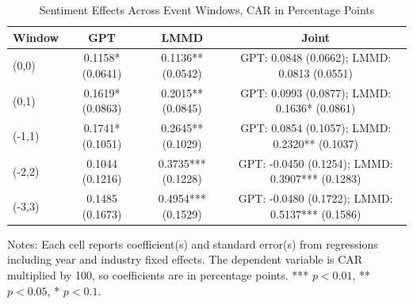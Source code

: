 \begin{table}[htbp]
\centering
\caption{Sentiment Effects Across Event Windows, CAR in Percentage Points}
\label{tab:car_sentiment_windows}
\begin{tabular}{lccc}
\toprule
Window & GPT & LMMD & Joint \\
\midrule
(0,0) & 0.1158* (0.0641) & 0.1136** (0.0542) & GPT: 0.0848 (0.0662); LMMD: 0.0813 (0.0551) \\
(0,1) & 0.1619* (0.0863) & 0.2015** (0.0845) & GPT: 0.0993 (0.0877); LMMD: 0.1636* (0.0861) \\
(-1,1) & 0.1741* (0.1051) & 0.2645** (0.1029) & GPT: 0.0854 (0.1057); LMMD: 0.2320** (0.1037) \\
(-2,2) & 0.1044 (0.1216) & 0.3735*** (0.1228) & GPT: -0.0450 (0.1254); LMMD: 0.3907*** (0.1283) \\
(-3,3) & 0.1485 (0.1673) & 0.4954*** (0.1529) & GPT: -0.0480 (0.1722); LMMD: 0.5137*** (0.1586) \\
\bottomrule
\end{tabular}
\begin{flushleft}
\footnotesize Notes: Each cell reports coefficient(s) and standard error(s) from regressions including year and industry fixed effects. The dependent variable is CAR multiplied by 100, so coefficients are in percentage points. *** $p<0.01$, ** $p<0.05$, * $p<0.1$.
\end{flushleft}
\end{table}